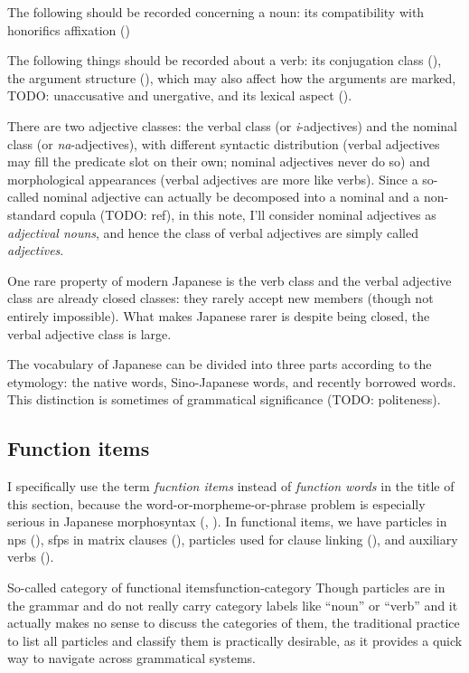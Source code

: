 \documentclass[UTF8, a4paper, oneside, scheme=plain]{ctexrep}
\newcommand*{\term}[1]{\emph{#1}}
\newcommand{\corpus}[1]{\emph{#1}}
\begin{document}
The following should be recorded concerning a noun:
its compatibility with honorifics affixation ()

The following things should be recorded about a verb:
its conjugation class (),
the argument structure (),
which may also affect how the arguments are marked,
TODO: unaccusative and unergative,
and its lexical aspect ().

There are two adjective classes:
the verbal class (or \corpus{i}-adjectives)
and the nominal class (or \corpus{na}-adjectives),
with different syntactic distribution 
(verbal adjectives may fill the predicate slot on their own; nominal adjectives never do so)
and morphological appearances
(verbal adjectives are more like verbs).
Since a so-called nominal adjective 
can actually be decomposed into a nominal and a non-standard copula (TODO: ref),
in this note, I'll consider nominal adjectives as \emph{adjectival nouns},
and hence the class of verbal adjectives are simply called \emph{adjectives}.

One rare property of modern Japanese is the verb class and the verbal adjective class 
are already closed classes:
they rarely accept new members (though not entirely impossible).
What makes Japanese rarer is despite being closed,
the verbal adjective class is large.

The vocabulary of Japanese can be divided into three parts according to the etymology:
the native words,
Sino-Japanese words,
and recently borrowed words.
This distinction is sometimes of grammatical significance (TODO: politeness).

\subsection{Function items}

I specifically use the term \term{fucntion items} instead of \term{function words}
in the title of this section,
because the word-or-morpheme-or-phrase problem is especially serious in Japanese morphosyntax
(, ).
In functional items,
we have particles in \acs{np}s (),
\acs{sfp}s in matrix clauses (),
particles used for clause linking (),
and auxiliary verbs ().

\begin{theorybox}{So-called category of functional items}{function-category}
    Though particles are in the grammar and do not really carry category labels like ``noun'' or ``verb''
    and it actually makes no sense to discuss the categories of them,
    the traditional practice to list all particles and classify them 
    is practically desirable, 
    as it provides a quick way to navigate across grammatical systems.
\end{theorybox}
\end{document}
